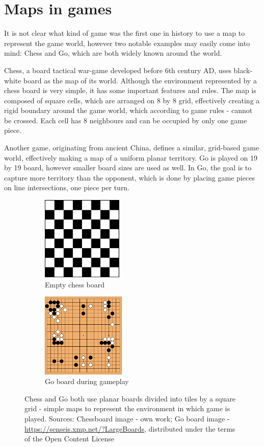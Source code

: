 \documentclass[12pt]{report}
\begin{document}
\section{Maps in games} 

It is not clear what kind of game was the first one in history to use a map to represent the game world, however two notable examples may easily come into mind: Chess and Go, which are both widely known around the world. 

Chess, a board tactical war-game developed before 6th century AD, uses black-white board as the map of its world. Although the environment represented by a chess board is very simple, it has some important features and rules. The map is composed of square cells, which are arranged on 8 by 8 grid, effectively creating a rigid boundary around the game world, which according to game rules - cannot be crossed. Each cell has 8 neighbours and can be occupied by only one game piece.

Another game, originating from ancient China, defines a similar, grid-based game world, effectively making a map of a uniform planar territory. Go is played on 19 by 19 board, however smaller board sizes are used as well. In Go, the goal is to capture more territory than the opponent, which is done by placing game pieces on line intersections, one piece per turn.


\begin{figure}[h]
	\centering
	\begin{subfigure}[t]{0.4\linewidth}
		\centering
		\includegraphics[height=4cm]{images/chessboard}
		\caption{Empty chess board} 
	\end{subfigure} \hspace{1em}
	\hfill
	\begin{subfigure}[t]{0.4\linewidth}
		\centering
		\includegraphics[height=4cm]{images/goboard}
		\caption{Go board during gameplay} 
	\end{subfigure} \hspace{1em} 
	\caption{Chess and Go both use planar boards divided into tiles by a square grid - simple maps to represent the environment in which game is played. Sources: Chessboard image - own work; Go board image - \url{https://senseis.xmp.net/?LargeBoards}, distributed under the terms of the Open Content License }
	\label{fig:neighborhood_types}
\end{figure}
 
\end{document}
